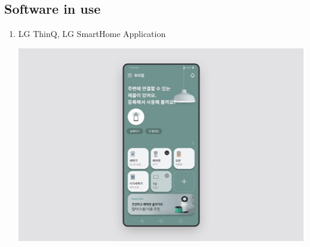 \documentclass[conference]{IEEEtran}
\begin{document}
\subsection{Software in use}
\begin{enumerate}
    \item LG ThinQ, LG SmartHome Application\\
    \centerline{\includegraphics[scale=0.30]{thinkq.jpg}}


\end{enumerate}
\end{document}
